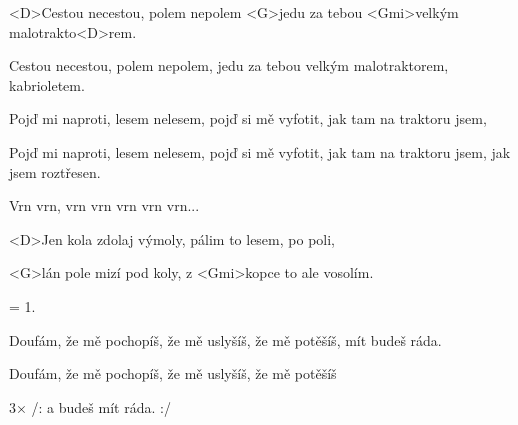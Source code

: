 

\zs
<D>Cestou necestou, polem nepolem <G>jedu za tebou <Gmi>velkým malotrakto<D>rem.

Cestou necestou, polem nepolem, jedu za tebou velkým malotraktorem, \\ kabrioletem.
\ks
 
\zs
Pojď mi naproti, lesem nelesem, pojď si mě vyfotit, jak tam na traktoru jsem, 

Pojď mi naproti, lesem nelesem, pojď si mě vyfotit, jak tam na traktoru jsem, jak jsem roztřesen.
\ks

\zs
Vrn vrn, vrn vrn vrn vrn vrn...
\ks
 
\zs
<D>Jen kola zdolaj výmoly, pálim to lesem, po poli, 

<G>lán pole mizí pod koly, z <Gmi>kopce to ale vosolím.
\ks
 
\zs
= 1.
\ks
 
\zs
Doufám, že mě pochopíš, že mě uslyšíš, že mě potěšíš, mít budeš ráda.
 
Doufám, že mě pochopíš, že mě uslyšíš, že mě potěšíš 

3× /: a budeš mít ráda. :/
\ks

\kp
